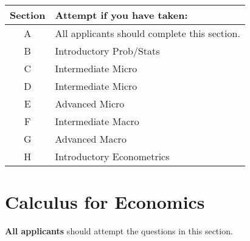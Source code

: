 \documentclass[addpoints,12pt,a4paper]{exam}
\begin{document}
\vspace{2em}

\begin{center}
  \begin{tabular}[h]{cl}
  \textbf{Section} & \textbf{Attempt if you have taken:}\\
    \hline
    A & All applicants should complete this section.\\
    B & Introductory Prob/Stats \\
    C & Intermediate Micro \\
    D & Intermediate Micro \\
    E & Advanced Micro\\
    F & Intermediate Macro\\
    G & Advanced Macro\\
    H & Introductory Econometrics \\
  \end{tabular}
\end{center}




\newpage


\section{Calculus for Economics}
\textbf{All applicants} should attempt the questions in this section. 
\end{document}
